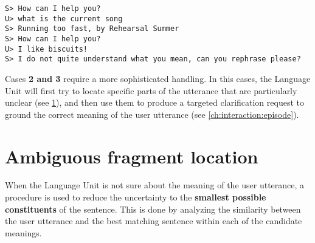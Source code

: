 \texttt{S> How can I help you? \\
U> what is the current song \\
S> Running too fast, by Rehearsal Summer \\
S> How can I help you? \\
U> I like biscuits! \\
S> I do not quite understand what you mean, can you rephrase please?}

Cases \textbf{2 and 3} require a more sophisticated handling. In this cases, the Language Unit will first try to locate specific parts of the utterance that are particularly unclear (see \ref{ch:interaction:afl}), and then use them to produce a targeted clarification request to ground the correct meaning of the user utterance (see \ref{ch:interaction:episode}).


\section{Ambiguous fragment location} \label{ch:interaction:afl}
When the Language Unit is not sure about the meaning of the user utterance, a procedure is used to reduce the uncertainty to the \textbf{smallest possible constituents} of the sentence. This is done by analyzing the similarity between the user utterance and the best matching sentence within each of the candidate meanings.

